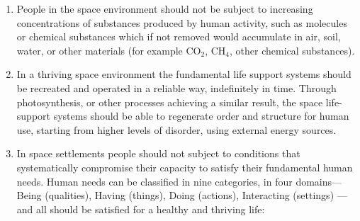 \documentclass[letter,11pt]{article}
\begin{document}
\begin{enumerate}

	\item     People in the space environment should not be subject to increasing
		concentrations of substances produced by human activity, such as molecules
		or chemical substances which if not removed would accumulate in air, soil,
		water, or other materials (for example CO$_2$, CH$_4$, other chemical
		substances).

	\item     In a thriving space environment the fundamental life support
		systems should be recreated and operated in a reliable way, indefinitely in
		time. Through photosynthesis, or other processes achieving a similar
		result, the space life-support systems should be able to regenerate order
		and structure for human use, starting from higher levels of disorder, using
		external energy sources.

 \item     In space settlements people should not subject to conditions that
	 systematically compromise their capacity to satisfy their fundamental human
	 needs. Human needs can be classified in nine categories, in four domains---%
	 Being (qualities), Having (things),  Doing (actions), Interacting (settings)%
	 ---and all should be satisfied for a healthy and thriving life:


\end{enumerate}
\end{document}
